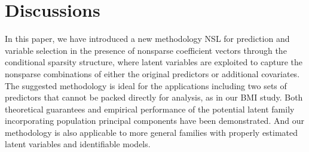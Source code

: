 \documentclass{statsoc}
\begin{document}


\section{Discussions} \label{Sec7}
In this paper, we have introduced a new methodology NSL for prediction and variable selection in the presence of nonsparse coefficient vectors through the conditional sparsity structure, where latent variables are exploited to capture the nonsparse combinations of either the original predictors or additional covariates. The suggested methodology is ideal for the applications including two sets of predictors that cannot be packed directly for analysis, as in our BMI study. Both theoretical guarantees and empirical performance of the potential latent family incorporating population principal components have been demonstrated. And our methodology is also applicable to more general families with properly estimated latent variables and identifiable models.
\end{document}
